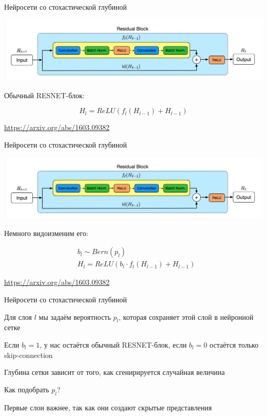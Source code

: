 \documentclass[notes,12pt, aspectratio=169]{beamer}
\newenvironment{wideitemize}{\itemize\addtolength{\itemsep}{10pt}}{\enditemize}
\begin{document}
\begin{frame}{Нейросети со стохастической глубиной}
\begin{center}
	\includegraphics[width=0.9\paperwidth]{resnet_stoc.png}
\end{center}

Обычный RESNET-блок: 

\[
H_l = ReLU(f_l(H_{l-1}) + H_{l-1} ) 
\]

\vfill %
\footnotesize 
\color{blue} \url{https://arxiv.org/abs/1603.09382}
\end{frame}


\begin{frame}{Нейросети со стохастической глубиной}
\begin{center}
	\includegraphics[width=0.9\paperwidth]{resnet_stoc.png}
\end{center}

Немного видоизменим его: 

\begin{equation*}
\begin{aligned}
& b_l \sim Bern(p_l) \\
& H_l = ReLU(b_l \cdot f_l(H_{l-1}) + H_{l-1} ) 
\end{aligned} 
\end{equation*}

\vfill %
\footnotesize 
\color{blue} \url{https://arxiv.org/abs/1603.09382}
\end{frame}


\begin{frame}{Нейросети со стохастической глубиной}
\begin{wideitemize}
	\item  Для слоя $l$ мы задаём вероятность $p_l$, которая сохраняет этой слой в нейронной сетке
	
	\item Если $b_l = 1$, у нас остаётся обычный RESNET-блок, если $b_l = 0$ остаётся только skip-connection
	
	\item Глубина сетки зависит от того, как сгенирируется случайная величина
	
	\item Как подобрать $p_l$? 
	
	\item Первые слои важнее, так как они создают скрытые представления
\end{wideitemize}
\end{frame}
\end{document}
